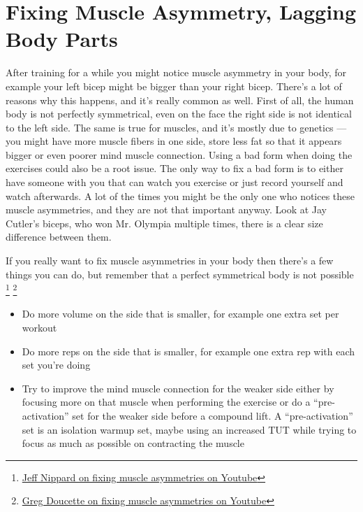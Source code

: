 \documentclass[openany, 12pt]{book}
\begin{document}
        \section{Fixing Muscle Asymmetry, Lagging Body Parts}

        After training for a while you might notice muscle asymmetry in your body, for example your left bicep might be bigger than your right bicep. There's a lot of reasons why this happens, and it's
        really common as well. First of all, the human body is not perfectly symmetrical, even on the face the right side is not identical to the left side. The same is true for muscles, and it's
        mostly due to genetics --- you might have more muscle fibers in one side, store less fat so that it appears bigger or even poorer mind muscle connection.
        Using a bad form when doing the exercises could also be a root issue.
        The only way to fix a bad form is to either have someone with you that can watch you exercise or just record yourself and watch afterwards. A lot of the times you might be the only one who notices
        these muscle asymmetries, and they are not that important anyway. Look at Jay Cutler's biceps, who won Mr. Olympia multiple times, there is a clear size difference between them.

        If you really want
        to fix muscle asymmetries in your body then there's a few things you can do, but remember that a perfect symmetrical body is not possible
        \footnote{\href{https://www.youtube.com/watch?v=zQTmfOsSXN0}{Jeff Nippard on fixing muscle asymmetries on Youtube}}
        \footnote{\href{https://www.youtube.com/watch?v=rlOa9L1gOA8}{Greg Doucette on fixing muscle asymmetries on Youtube}}

        \begin{itemize}
          \item Do more volume on the side that is smaller, for example one extra set per workout
          \item Do more reps on the side that is smaller, for example one extra rep with each set you're doing
          \item Try to improve the mind muscle connection for the weaker side either by focusing more on that muscle when performing the exercise or do a ``pre-activation'' set for the weaker side
            before a compound lift. A ``pre-activation'' set is an isolation warmup set, maybe using an increased TUT while trying to focus as much as possible on contracting the muscle
        \end{itemize}
\end{document}
